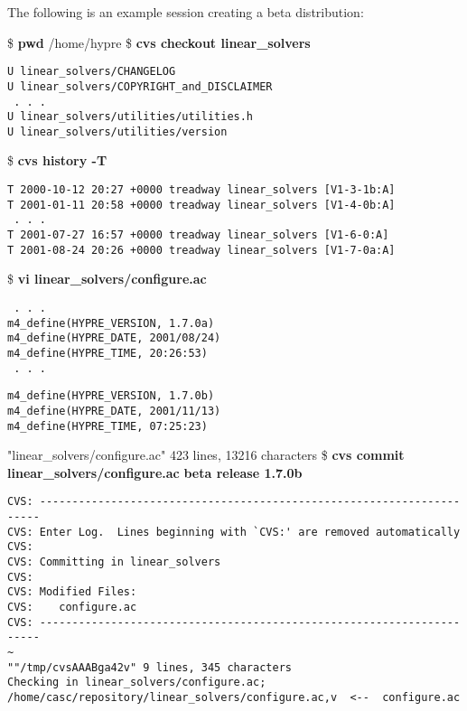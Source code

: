 The following is an example session creating a beta distribution:
\begin{ttfamily}
\begin{mdseries}
\linebreak
\$ \textbf{pwd}\linebreak
/home/hypre\linebreak
\$ \textbf{cvs checkout linear\_solvers}\linebreak
\begin{verbatim}
U linear_solvers/CHANGELOG
U linear_solvers/COPYRIGHT_and_DISCLAIMER
 . . .
U linear_solvers/utilities/utilities.h
U linear_solvers/utilities/version
\end{verbatim}
\$ \textbf{cvs history -T}\linebreak
\begin{verbatim}
T 2000-10-12 20:27 +0000 treadway linear_solvers [V1-3-1b:A]
T 2001-01-11 20:58 +0000 treadway linear_solvers [V1-4-0b:A]
 . . .
T 2001-07-27 16:57 +0000 treadway linear_solvers [V1-6-0:A]
T 2001-08-24 20:26 +0000 treadway linear_solvers [V1-7-0a:A]
\end{verbatim}
\$ \textbf{vi linear\_solvers/configure.ac}\linebreak
\begin{verbatim}
 . . .
m4_define(HYPRE_VERSION, 1.7.0a)
m4_define(HYPRE_DATE, 2001/08/24)
m4_define(HYPRE_TIME, 20:26:53)
 . . .
\end{verbatim}
\begin{bfseries}
\begin{verbatim}
m4_define(HYPRE_VERSION, 1.7.0b)
m4_define(HYPRE_DATE, 2001/11/13)
m4_define(HYPRE_TIME, 07:25:23)
\end{verbatim}
\end{bfseries}
"linear\_solvers/configure.ac" 423 lines, 13216 characters\linebreak
\$ \textbf{cvs commit linear\_solvers/configure.ac}\linebreak
\textbf{beta release 1.7.0b}\linebreak
\begin{verbatim}
CVS: ----------------------------------------------------------------------
CVS: Enter Log.	 Lines beginning with `CVS:' are removed automatically
CVS:
CVS: Committing in linear_solvers
CVS:
CVS: Modified Files:
CVS:	configure.ac
CVS: ----------------------------------------------------------------------
~
""/tmp/cvsAAABga42v" 9 lines, 345 characters
Checking in linear_solvers/configure.ac;
/home/casc/repository/linear_solvers/configure.ac,v  <--  configure.ac

\end{verbatim}
\end{mdseries}
\end{ttfamily}
